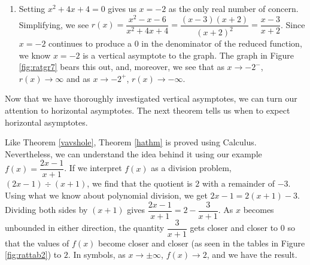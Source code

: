 {\begin{enumerate}
\item  Setting $x^2+4x+4 = 0$ gives us $x=-2$ as the only real number of concern.  Simplifying, we see  $r(x) = \dfrac{x^2-x-6}{x^2+4x+4} = \dfrac{(x-3)(x+2)}{(x+2)^2} = \dfrac{x-3}{x+2}$.  Since $x=-2$ continues to produce a $0$ in the denominator of the reduced function, we know $x=-2$ is a vertical asymptote to the graph.  The graph in Figure \ref{fig:ratgr7} bears this out, and, moreover, we see that as $x\rightarrow -2^{-}$, $r(x) \rightarrow \infty$ and as $x \rightarrow -2^{+}$, $r(x) \rightarrow -\infty$.


\end{enumerate}
}

\medskip

\medskip

Now that we have thoroughly investigated vertical asymptotes, we can turn our attention to horizontal asymptotes.  The next theorem tells us when to expect horizontal asymptotes.

\smallskip


\smallskip



Like Theorem \ref{vavshole}, Theorem \ref{hathm} is proved using Calculus.  Nevertheless, we can understand the idea behind it using our example $f(x) = \dfrac{2x-1}{x+1}$.  If we interpret $f(x)$ as a division problem, $(2x-1) \div (x+1)$, we find that the quotient is $2$ with a remainder of $-3$.  Using what we know about polynomial division,  we get $2x-1 = 2(x+1) -3$.  Dividing both sides by $(x+1)$ gives   $\dfrac{2x-1}{x+1} = 2 - \dfrac{3}{x+1}$.   As $x$ becomes unbounded in either direction, the quantity $\dfrac{3}{x+1}$ gets closer and closer to $0$ so that the values of $f(x)$ become closer and closer (as seen in the tables in Figure \ref{fig:rattab2}) to $2$. In symbols, as $x \rightarrow \pm \infty$, $f(x) \rightarrow 2$, and we have the result.

